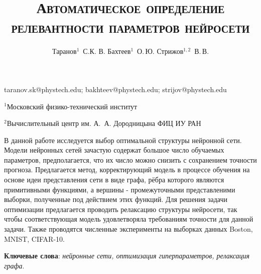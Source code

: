 \documentclass[12pt, twoside]{article}
\begin{document}
\title{\textsc{Автоматическое определение релевантности параметров нейросети}}

\author
    {Таранов$^1$~С.К. В. Бахтеев$^1$~О.\,Ю.  Стрижов$^{1,2}$~В.\,В.} 

\email
    {taranov.sk@phystech.edu; bakhteev@phystech.edu; strijov@phystech.edu}
    
\organization
    {$^1$Московский физико-технический институт\par
    $^2$Вычислительный центр им. А.~А. Дородницына ФИЦ ИУ РАН}

\abstract
	{В данной работе исследуется выбор оптимальной структуры нейронной сети.  Модели нейронных сетей зачастую содержат большое число обучаемых параметров, предполагается, что их число можно снизить с сохранением точности прогноза. Предлагается метод, корректирующий модель в процессе обучения на основе идеи представления сети в виде графа, рёбра которого являются примитивными функциями, а вершины - промежуточными представленими выборки, полученные под действием этих функций. Для решения задачи оптимизации предлагается проводить релаксацию структуры нейросети, так чтобы соответствующая модель удовлетворяла требованиям точности для данной задачи. Также проводятся численные эксперименты на выборках данных Boston, MNIST, CIFAR-10.

\bigskip
\textbf{Ключевые слова}: \emph {нейронные сети, оптимизация гиперпараметров, релаксация графа}.

}

\maketitle
\end{document}
